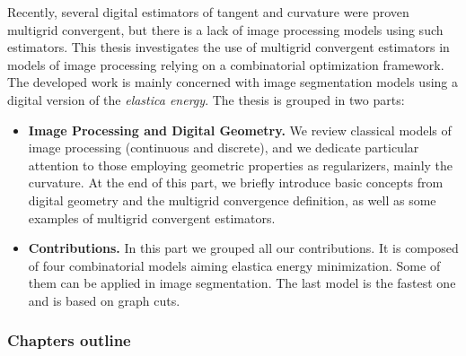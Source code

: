 Recently, several digital estimators of tangent and curvature were proven multigrid convergent, but there is a lack of image processing models using such estimators. This thesis investigates the use of multigrid convergent estimators in models of image processing relying on a combinatorial optimization framework. The developed work is mainly concerned with image segmentation models using a digital version of the \emph{elastica energy}. The thesis is grouped in two parts:

\begin{itemize}
	\item[]{\textbf{Image Processing and Digital Geometry.} We review classical models of image processing (continuous and discrete), and we dedicate particular attention to those employing geometric properties as regularizers, mainly the curvature. At the end of this part, we briefly introduce basic concepts from digital geometry and the multigrid convergence definition, as well as some examples of multigrid convergent estimators.}
	\item[]{\textbf{Contributions.} In this part we grouped all our contributions. It is composed of four combinatorial models aiming elastica energy minimization. Some of them can be applied in image segmentation. The last model is the fastest one and is based on graph cuts.}
\end{itemize}

\subsubsection{Chapters outline}

